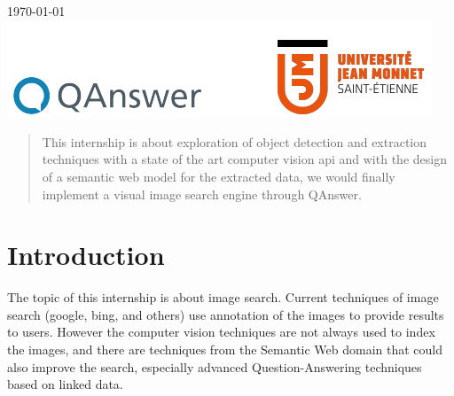 \documentclass[12pt]{article}
\begin{document}
\begin{titlepage}
\begin{minipage}{0.4\textwidth}
\begin{flushright}
\end{flushright}
\end{minipage}\\[4cm]



{\large \today}\\[3cm] %


\includegraphics{logo.png}\\[1cm] %
 

\vfill %

\end{titlepage}

\tableofcontents
\newpage
\listoffigures


\newpage
\begin{abstract}
    This internship is about exploration of object detection and extraction techniques with a state of the art computer vision api and with the design of a semantic web model for the extracted data, we would finally implement a visual image search engine through QAnswer.


\end{abstract}



\section{Introduction}
The topic of this internship is about image search. Current techniques
of image search (google, bing, and others) use annotation of the images
to provide results to users. However the computer vision techniques are
not always used to index the images, and there are techniques from the
Semantic Web domain that could also improve the search, especially advanced Question-Answering
techniques based on linked data.
\end{document}
